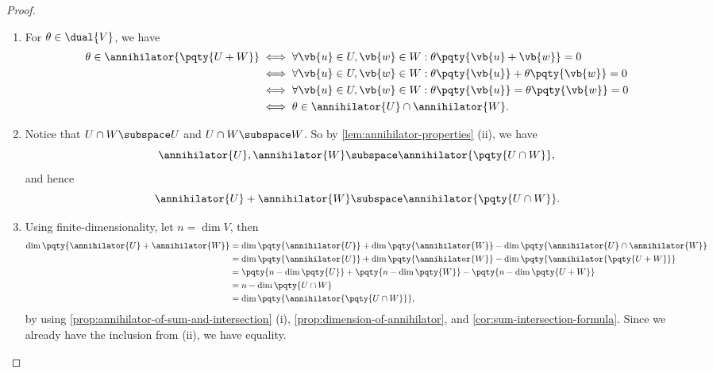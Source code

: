 \begin{proof}
    \begin{enumerate}[label=(\roman*)]
        \item For \(\theta \in \dual{V}\), we have
        \begin{align*}
            \theta \in \annihilator{\pqty{U + W}} &\iff \forall \vb{u} \in U, \vb{w} \in W: \theta\pqty{\vb{u} + \vb{w}} = 0 \\
            &\iff \forall \vb{u} \in U, \vb{w} \in W: \theta\pqty{\vb{u}} + \theta\pqty{\vb{w}} = 0 \\
            &\iff \forall \vb{u} \in U, \vb{w} \in W: \theta\pqty{\vb{u}} = \theta\pqty{\vb{w}} = 0 \\
            &\iff \theta \in \annihilator{U} \cap \annihilator{W}.
        \end{align*}

        \item Notice that \(U \cap W \subspace U\) and \(U \cap W \subspace W\). So by \autoref{lem:annihilator-properties} (ii), we have
        \[
            \annihilator{U}, \annihilator{W} \subspace \annihilator{\pqty{U \cap W}},
        \]
        and hence
        \[
            \annihilator{U} + \annihilator{W} \subspace \annihilator{\pqty{U \cap W}}.
        \]

        \item Using finite-dimensionality, let \(n = \dim V\), then
        \begin{align*}
            \dim\pqty{\annihilator{U} + \annihilator{W}} &= \dim\pqty{\annihilator{U}} + \dim\pqty{\annihilator{W}} - \dim\pqty{\annihilator{U} \cap \annihilator{W}} \\
            &= \dim\pqty{\annihilator{U}} + \dim\pqty{\annihilator{W}} - \dim\pqty{\annihilator{\pqty{U + W}}} \\
            &= \pqty{n - \dim\pqty{U}} + \pqty{n - \dim\pqty{W}} - \pqty{n - \dim\pqty{U + W}} \\
            &= n - \dim\pqty{U \cap W} \\
            &= \dim\pqty{\annihilator{\pqty{U \cap W}}},
        \end{align*}
        by using \autoref{prop:annihilator-of-sum-and-intersection} (i), \autoref{prop:dimension-of-annihilator}, and \autoref{cor:sum-intersection-formula}. Since we already have the inclusion from (ii), we have equality.
    \end{enumerate}
\end{proof}

